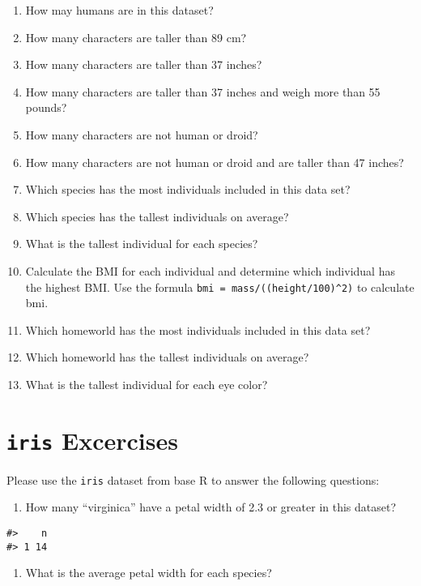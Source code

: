\documentclass[
]{book}
\providecommand{\tightlist}{%
  \setlength{\itemsep}{0pt}\setlength{\parskip}{0pt}}
\begin{document}
\begin{enumerate}
\def\labelenumi{\arabic{enumi}.}
\tightlist
\item
  How may humans are in this dataset?
\item
  How many characters are taller than 89 cm?
\item
  How many characters are taller than 37 inches?
\item
  How many characters are taller than 37 inches and weigh more than 55 pounds?
\item
  How many characters are not human or droid?
\item
  How many characters are not human or droid and are taller than 47 inches?
\item
  Which species has the most individuals included in this data set?
\item
  Which species has the tallest individuals on average?
\item
  What is the tallest individual for each species?
\item
  Calculate the BMI for each individual and determine which individual has the highest BMI. Use the formula \texttt{bmi\ =\ mass/((height/100)\^{}2)} to calculate bmi.
\item
  Which homeworld has the most individuals included in this data set?
\item
  Which homeworld has the tallest individuals on average?
\item
  What is the tallest individual for each eye color?
\end{enumerate}

\hypertarget{iris-excercises}{%
\section{\texorpdfstring{\texttt{iris} Excercises}{iris Excercises}}\label{iris-excercises}}

Please use the \texttt{iris} dataset from base R to answer the following questions:

\begin{enumerate}
\def\labelenumi{\arabic{enumi}.}
\tightlist
\item
  How many ``virginica'' have a petal width of 2.3 or greater in this dataset?
\end{enumerate}

\begin{verbatim}
#>    n
#> 1 14
\end{verbatim}

\begin{enumerate}
\def\labelenumi{\arabic{enumi}.}
\setcounter{enumi}{1}
\tightlist
\item
  What is the average petal width for each species?
\end{enumerate}
\end{document}
